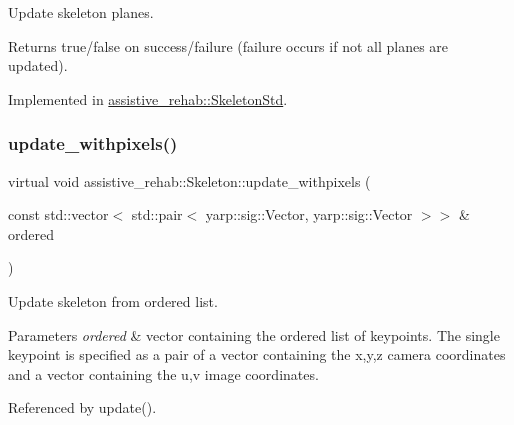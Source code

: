 Update skeleton planes. 

\begin{DoxyReturn}{Returns}
true/false on success/failure (failure occurs if not all planes are updated). 
\end{DoxyReturn}


Implemented in \hyperlink{classassistive__rehab_1_1SkeletonStd_a5769bc6fd407118c866b57b869d672ca}{assistive\+\_\+rehab\+::\+Skeleton\+Std}.

\mbox{\label{classassistive__rehab_1_1Skeleton_a20d9eb5aecd6dccfa7e049bb932a6cef}} 
\subsubsection{\texorpdfstring{update\+\_\+withpixels()}{update\_withpixels()}\hspace{0.1cm}{\footnotesize\ttfamily [1/2]}}
{\footnotesize\ttfamily virtual void assistive\+\_\+rehab\+::\+Skeleton\+::update\+\_\+withpixels (\begin{DoxyParamCaption}\item[{const std\+::vector$<$ std\+::pair$<$ yarp\+::sig\+::\+Vector, yarp\+::sig\+::\+Vector $>$$>$ \&}]{ordered }\end{DoxyParamCaption})\hspace{0.3cm}{\ttfamily [virtual]}}



Update skeleton from ordered list. 


\begin{DoxyParams}{Parameters}
{\em ordered} & vector containing the ordered list of keypoints. The single keypoint is specified as a pair of a vector containing the x,y,z camera coordinates and a vector containing the u,v image coordinates. \\
\hline
\end{DoxyParams}


Referenced by update().

\mbox{\label{classassistive__rehab_1_1Skeleton_a36e9dfd4910120025e40ccc3d03c0e01}} 
